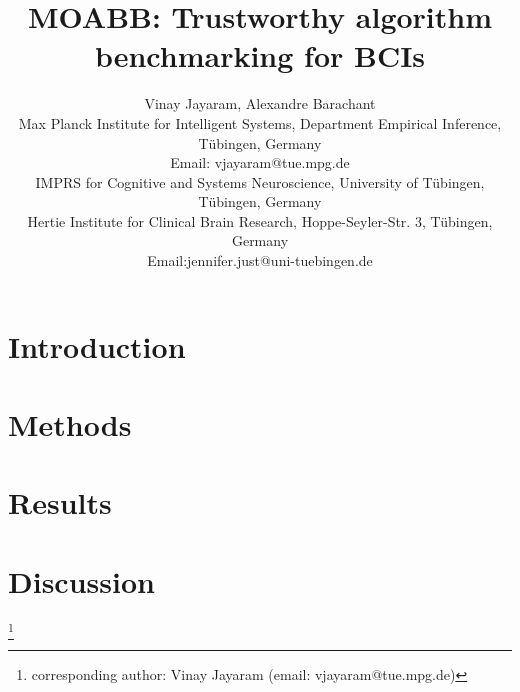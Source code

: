 \documentclass[journal]{IEEEtran}
\title{MOABB: Trustworthy algorithm benchmarking for BCIs}
\author{
  \IEEEauthorblockN
  {
    Vinay Jayaram\IEEEauthorrefmark{1}\IEEEauthorrefmark{2},
    Alexandre Barachant\IEEEauthorrefmark{3}
  }

  \IEEEauthorblockA
  {
    \IEEEauthorrefmark{1}
    Max Planck Institute for Intelligent Systems, 
    Department Empirical Inference, 
    T\"{u}bingen, Germany \\
    Email: vjayaram@tue.mpg.de}
  
  \IEEEauthorblockA
  {
    \IEEEauthorrefmark{2}
    IMPRS for Cognitive and Systems Neuroscience, 
    University of T\"{u}bingen, 
    T\"{u}bingen, Germany \\
  }
  \IEEEauthorblockA
  {
    \IEEEauthorrefmark{3}
    Hertie Institute for Clinical Brain Research,
    Hoppe-Seyler-Str. 3,
    T\"{u}bingen, Germany \\
    Email:jennifer.just@uni-tuebingen.de
  }
}
\newcommand\blfootnote[1]{%
  \begingroup
  \renewcommand\thefootnote{}\footnote{#1}%
  \addtocounter{footnote}{-1}%
  \endgroup
}
\begin{document}
\maketitle
\begin{abstract}
  
\end{abstract}
\section{Introduction}

\section{Methods}

\section{Results}

\section{Discussion}



\blfootnote{corresponding author: Vinay Jayaram (email: vjayaram@tue.mpg.de)}
\end{document}
